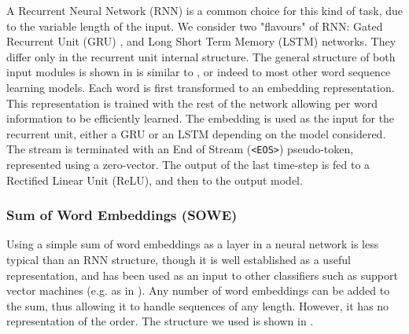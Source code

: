 \documentclass[]{clv3}
\newcommand{\parencite}{\citep}
\newcommand{\textcite}{\citet}
\newcommand{\natlang}[1]{\texttt{#1}}
\begin{document}
A Recurrent Neural Network (RNN) is a common choice for this kind of task,
due to the variable length of the input.
We consider two "flavours" of RNN: Gated Recurrent Unit (GRU)  \parencite{cho2014properties}, and  Long Short Term Memory (LSTM) \parencite{hochreiter1997long,gers1999learning} networks.
They differ only in the recurrent unit internal structure.
The general structure of both input modules is  shown in  is similar to \textcite{2016arXiv160603821M}, or indeed to most other word sequence learning models.
Each word is first transformed to an embedding representation.
This representation is trained with the rest of the network allowing per word information to be efficiently learned.
The embedding is used as the input for the recurrent unit, either a GRU or an LSTM depending on the model considered.
The stream is terminated with an End of Stream (\natlang{<EOS>}) pseudo-token,
represented using a zero-vector.
The output of the last time-step is fed to a Rectified Linear Unit (ReLU), and then to the output model.




\subsubsection{Sum of Word Embeddings (SOWE)}\label{sec:sowemod}
Using a simple sum of word embeddings as a layer in a neural network is less typical than an RNN structure,
though it is well established as a useful representation, and has been used as an input to other classifiers such as support vector machines (e.g. as in \textcite{White2015SentVecMeaning,novelperspective}).
Any number of word embeddings can be added to the sum, thus allowing it to handle sequences of any length.
However, it has no representation of the order.
The structure we used is shown in .
\end{document}

